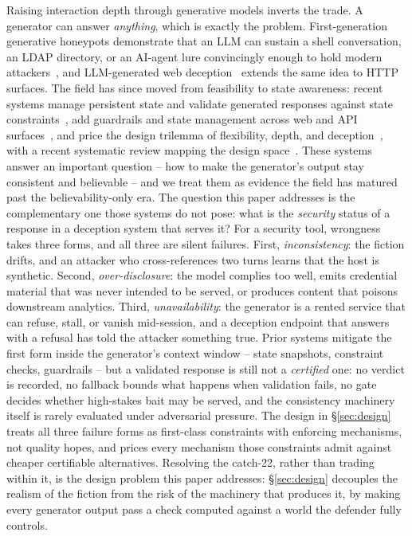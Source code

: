 Raising interaction depth through generative models inverts the trade.
A generator can answer \emph{anything}, which is exactly the problem.
First-generation generative honeypots demonstrate that an LLM can sustain
a shell conversation, an LDAP directory, or an AI-agent lure convincingly
enough to hold modern attackers~\cite{valeros2024,reworr2024,jimenez2025},
and LLM-generated web deception~\cite{galah2024} extends the same idea to
HTTP surfaces. The field has since moved from feasibility to state
awareness: recent systems manage persistent state and validate generated
responses against state constraints~\cite{li2026llmsshh}, add guardrails
and state management across web and API surfaces~\cite{laragutierrez2026genpot},
and price the design trilemma of flexibility, depth, and
deception~\cite{wang2026honeygpt}, with a recent systematic review
mapping the design space~\cite{bridges2026}. These systems answer an
important question -- how to make the generator's output stay consistent
and believable -- and we treat them as evidence the field has matured
past the believability-only era. The question this paper addresses is
the complementary one those systems do not pose: what is the
\emph{security} status of a response in a deception system that serves
it? For a security tool, wrongness takes three forms, and all three are
silent failures. First, \emph{inconsistency}: the fiction drifts, and an
attacker who cross-references two turns learns that the host is
synthetic. Second, \emph{over-disclosure}: the model complies too well,
emits credential material that was never intended to be served, or
produces content that poisons downstream analytics. Third,
\emph{unavailability}: the generator is a rented service that can
refuse, stall, or vanish mid-session, and a deception endpoint that
answers with a refusal has told the attacker something true. Prior
systems mitigate the first form inside the generator's context window --
state snapshots, constraint checks, guardrails -- but a validated
response is still not a \emph{certified} one: no verdict is recorded,
no fallback bounds what happens when validation fails, no gate decides
whether high-stakes bait may be served, and the consistency machinery
itself is rarely evaluated under adversarial pressure. The design in
\S\ref{sec:design} treats all three failure forms as first-class
constraints with enforcing mechanisms, not quality hopes, and prices
every mechanism those constraints admit against cheaper certifiable
alternatives.
Resolving the catch-22, rather than trading within it, is the design
problem this paper addresses: \S\ref{sec:design} decouples the realism
of the fiction from the risk of the machinery that produces it, by
making every generator output pass a check computed against a world the
defender fully controls.

